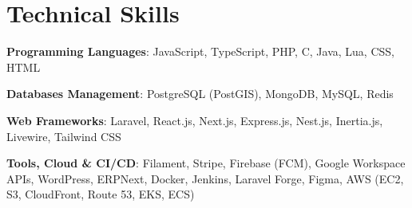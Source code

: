 \section{Technical Skills}
\begin{itemize}[leftmargin=0.15in, label={}, itemsep=-0.04in]
	\small{
	\item \textbf{Programming Languages}: JavaScript, TypeScript, PHP, C, Java, Lua, CSS, HTML
	\item \textbf{Databases Management}: PostgreSQL (PostGIS), MongoDB, MySQL, Redis
	\item \textbf{Web Frameworks}: Laravel, React.js, Next.js, Express.js, Nest.js, Inertia.js, Livewire, Tailwind CSS
	\item \textbf{Tools, Cloud \& CI/CD}: Filament, Stripe, Firebase (FCM), Google Workspace APIs, WordPress, ERPNext, Docker, Jenkins, Laravel Forge, Figma, AWS (EC2, S3, CloudFront, Route 53, EKS, ECS)
	      }
\end{itemize}
